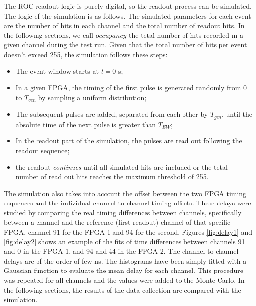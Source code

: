 The ROC readout logic is purely digital, so the readout process can be simulated. 
The logic of the simulation is as follows. The simulated parameters for each event are the number of hits in each channel
and the total number of readout hits. In the following sections, we call $occupancy$ the total number of hits
recorded in a given channel during the test run. Given that the total number of hits per event doesn't exceed 255, the simulation follows these steps:
\begin{itemize}
\item
  The event window starts at $t=0$ s;
\item
  In a given FPGA, the timing of the first pulse is generated randomly from 0 to $T_{gen}$
  by sampling a uniform distribution;
\item
  The subsequent pulses are added, separated from each other by $T_{gen}$,
  until the absolute time
  of the next pulse is greater than $T_{EW}$;
\item
  In the readout part of the simulation, the pulses are read out following the readout sequence;
\item
  the readout \textit{continues} until all simulated hits are included or
  the total number of read out hits reaches the maximum threshold of 255. 
\end{itemize}

The simulation also takes into account the offset between the two FPGA timing sequences and the 
individual channel-to-channel timing offsets. These delays were studied by comparing the real timing 
differences between channels, specifically between a channel and the reference (first readout) channel of that 
specific FPGA, channel 91 for the FPGA-1 and 94 for the second. Figures \ref{fig:delay1} and \ref{fig:delay2} 
shows an example of the fits of time differences between channels 91 and 0 in the FPGA-1, and 94 and 44 in the FPGA-2. 
The channel-to-channel delays are of the order of few ns. The histograms have been simply fitted with a Gaussian function 
to evaluate the mean delay for each channel. This procedure was repeated for all channels and the values were added to the Monte Carlo.
In the following sections, the results of the data collection are compared with the simulation.

